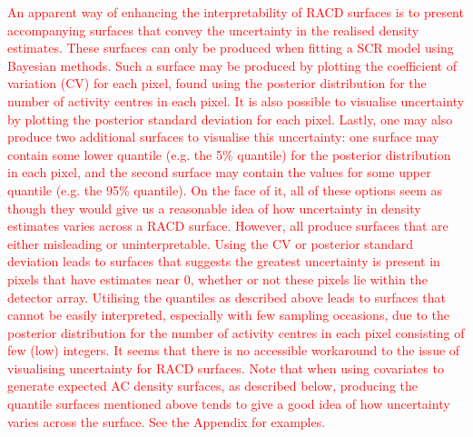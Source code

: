 \documentclass[useAMS,usenatbib,referee]{biom}
\begin{document}
\textcolor{red}{An apparent way of enhancing the interpretability of RACD surfaces is to present accompanying surfaces that convey the uncertainty in the realised density estimates. These surfaces can only be produced when fitting a SCR model using Bayesian methods. Such a surface may be produced by plotting the coefficient of variation (CV) for each pixel, found using the posterior distribution for the number of activity centres in each pixel. It is also possible to visualise uncertainty by plotting the posterior standard deviation for each pixel. Lastly, one may also produce two additional surfaces to visualise this uncertainty: one surface may contain some lower quantile (e.g. the 5\% quantile) for the posterior distribution in each pixel, and the second surface may contain the values for some upper quantile (e.g. the 95\% quantile). On the face of it, all of these options seem as though they would give us a reasonable idea of how uncertainty in density estimates varies across a RACD surface. However, all produce surfaces that are either misleading or uninterpretable. Using the CV or posterior standard deviation leads to surfaces that suggests the greatest uncertainty is present in pixels that have estimates near 0, whether or not these pixels lie within the detector array. Utilising the quantiles as described above leads to surfaces that cannot be easily interpreted, especially with few sampling occasions, due to the posterior distribution for the number of activity centres in each pixel consisting of few (low) integers. It seems that there is no accessible workaround to the issue of visualising uncertainty for RACD surfaces.  Note that when using covariates to generate expected AC density surfaces, as described below, producing the quantile surfaces mentioned above tends to give a good idea of how uncertainty varies across the surface. See the Appendix for examples.}


\end{document}

